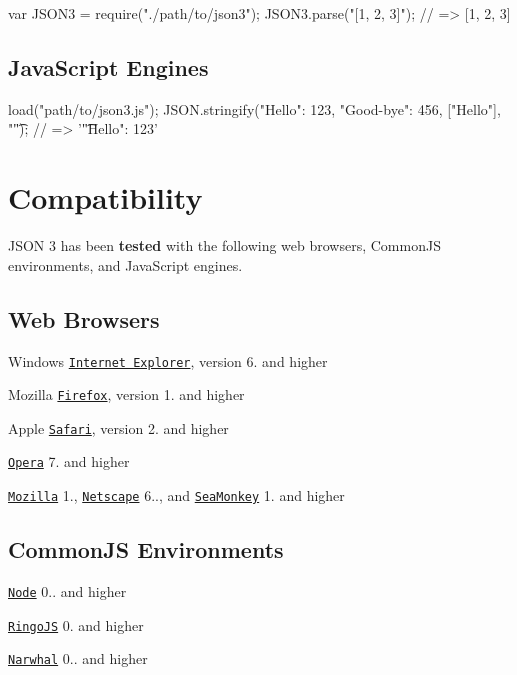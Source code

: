 \begin{DoxyVerb}var JSON3 = require("./path/to/json3");
JSON3.parse("[1, 2, 3]");
// => [1, 2, 3]
\end{DoxyVerb}


\subsection*{Java\+Script Engines}

\begin{DoxyVerb}load("path/to/json3.js");
JSON.stringify({"Hello": 123, "Good-bye": 456}, ["Hello"], "\t");
// => '{\n\t"Hello": 123\n}'
\end{DoxyVerb}


\section*{Compatibility}

J\+S\+ON 3 has been {\bfseries tested} with the following web browsers, Common\+JS environments, and Java\+Script engines.

\subsection*{Web Browsers}


\begin{DoxyItemize}
\item Windows \href{http://www.microsoft.com/windows/internet-explorer}{\tt Internet Explorer}, version 6. and higher
\item Mozilla \href{http://www.mozilla.com/firefox}{\tt Firefox}, version 1. and higher
\item Apple \href{http://www.apple.com/safari}{\tt Safari}, version 2. and higher
\item \href{http://www.opera.com}{\tt Opera} 7. and higher
\item \href{http://sillydog.org/narchive/gecko.php}{\tt Mozilla} 1., \href{http://sillydog.org/narchive/}{\tt Netscape} 6.., and \href{http://www.seamonkey-project.org/}{\tt Sea\+Monkey} 1. and higher
\end{DoxyItemize}

\subsection*{Common\+JS Environments}


\begin{DoxyItemize}
\item \href{http://nodejs.org/}{\tt Node} 0.. and higher
\item \href{http://ringojs.org/}{\tt Ringo\+JS} 0. and higher
\item \href{http://narwhaljs.org/}{\tt Narwhal} 0.. and higher
\end{DoxyItemize}

